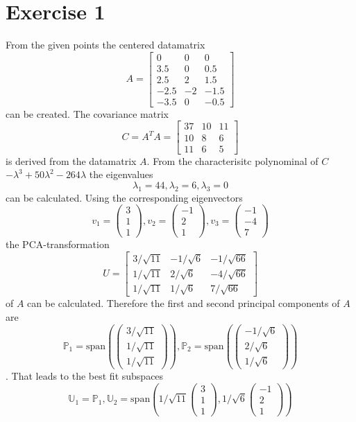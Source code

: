 \section*{Exercise 1}
From the given points the centered datamatrix \[A = \left[\begin{matrix}
0&0&0\\3.5&0&0.5\\2.5&2&1.5\\-2.5&-2&-1.5\\-3.5&0&-0.5
\end{matrix}\right]\] can be created.
The covariance matrix \[C=A^TA = \left[\begin{matrix}
37&10&11\\10&8&6\\11&6&5
\end{matrix}\right]\] is derived from the datamatrix $A$.
From the characterisitc polynominal of $C$ $-\lambda^3+50\lambda^2-264\lambda$ the eigenvalues \[\lambda_1 = 44, \lambda_2 = 6, \lambda_3 = 0\] can be calculated.
Using the corresponding eigenvectors \[v_1 = \left(\begin{matrix}
3\\1\\1
\end{matrix}\right),v_2=\left(\begin{matrix}
-1\\2\\1
\end{matrix}\right), v_3 = \left(\begin{matrix}
-1\\-4\\7
\end{matrix}\right)\]
the PCA-transformation \[U= \left[\begin{matrix}3/ \sqrt{11} & -1/\sqrt{6} & -1/\sqrt{66}\\1/\sqrt{11}&2/\sqrt{6}&-4/\sqrt{66} \\1/ \sqrt{11} & 1/\sqrt{6} & 7/\sqrt{66} \end{matrix}\right]\] of $A$ can be calculated.
Therefore the first and second principal components of $A$ are 
\[\mathbb{P}_1 = \text{span}\left(\left(\begin{matrix}
3/\sqrt{11}\\1/\sqrt{11}\\1/\sqrt{11}
\end{matrix}\right)\right),\mathbb{P}_2= \text{span}\left(\left(\begin{matrix}
-1/\sqrt{6}\\2/\sqrt{6}\\1/\sqrt{6}
\end{matrix}\right)\right)\].
That leads to the best fit subspaces \[\mathbb{U}_1 = \mathbb{P}_1, \mathbb{U}_2 = \text{span}\left(1/\sqrt{11}\left(\begin{matrix}
3\\1\\1
\end{matrix}\right),1/\sqrt{6}\left(\begin{matrix}
-1\\2\\1
\end{matrix}\right)\right)\]